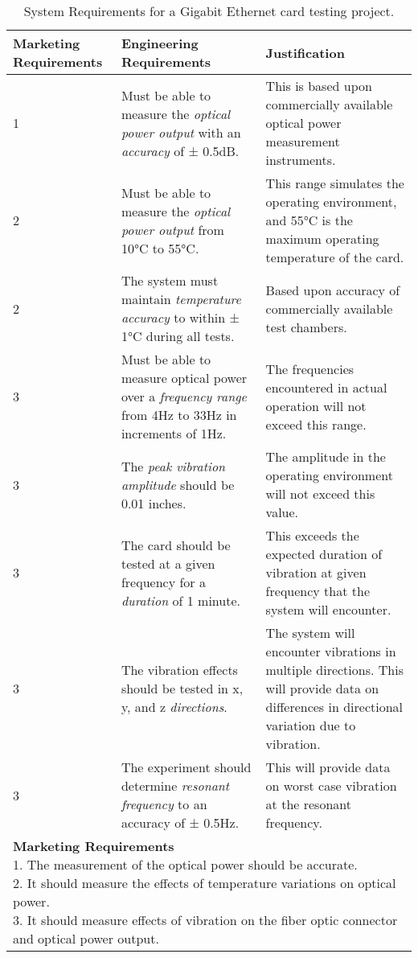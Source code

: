 \begin{table}
\centering
\caption{System Requirements for a Gigabit Ethernet card
testing project.}
\label{table:gigabit}

\begin{tabular}{ |p{2cm}|p{5cm}|p{5cm}|} 
\hline
\rowcolor{Gray}
\textbf{Marketing Requirements} & \textbf{Engineering Requirements} & \textbf{Justification} \\ \hline

1 & Must be able to measure the \emph{optical power output} with an
\emph{accuracy} of ± 0.5dB. & This is based upon commercially available
optical power measurement instruments. \\ \hline
2 & Must be able to measure the \emph{optical power output} from 10°C to
55°C. & This range simulates the operating environment, and 55°C is the
maximum operating temperature of the card. \\ \hline
2 & The system must maintain \emph{temperature accuracy} to within ± 1°C
during all tests. & Based upon accuracy of commercially available test
chambers. \\ \hline
3 & Must be able to measure optical power over a \emph{frequency range}
from 4Hz to 33Hz in increments of 1Hz. & The frequencies encountered in
actual operation will not exceed this range. \\ \hline
3 & The \emph{peak vibration amplitude} should be 0.01 inches. & The
amplitude in the operating environment will not exceed this value. \\ \hline
3 & The card should be tested at a given frequency for a \emph{duration}
of 1 minute. & This exceeds the expected duration of vibration at given
frequency that the system will encounter. \\ \hline
3 & The vibration effects should be tested in x, y, and z
\emph{directions}. & The system will encounter vibrations in multiple
directions. This will provide data on differences in directional
variation due to vibration. \\ \hline
3 & The experiment should determine \emph{resonant frequency} to an
accuracy of ± 0.5Hz. & This will provide data on worst case vibration at
the resonant frequency. \\ \hline

\multicolumn{3}{|p{12cm}|}{
\textbf{Marketing Requirements} \newline
1.  The measurement of the optical power should be accurate.\newline
2.  It should measure the effects of temperature variations on optical power.\newline
3.  It should measure effects of vibration on the fiber optic connector
  and optical power output.}  \\ \hline
\end{tabular}
\end{table}

